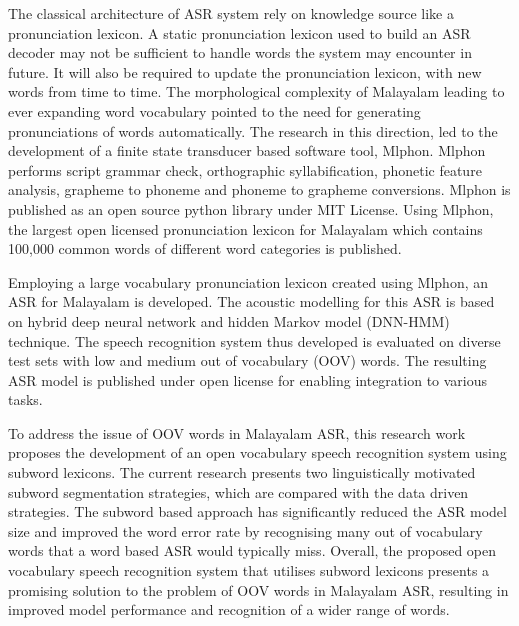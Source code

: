 The classical architecture of ASR system rely on knowledge source like a pronunciation lexicon. A static pronunciation lexicon used to build an
ASR decoder may not be sufficient to handle words the system may encounter in
future. It will also be required to  update the pronunciation lexicon, with new words from time to time.  The morphological complexity of Malayalam leading to ever expanding word vocabulary pointed to the need for generating pronunciations of words automatically. The research in this direction, led to the development of a finite state transducer based software tool, Mlphon. Mlphon performs script grammar check, orthographic syllabification, phonetic feature analysis, grapheme to phoneme and phoneme to grapheme conversions. Mlphon is published as an open source python library under MIT License. Using Mlphon, the largest open licensed pronunciation lexicon for Malayalam which contains 100,000 common words of different word categories is published.

Employing a large vocabulary pronunciation lexicon created using Mlphon, an ASR for Malayalam is developed. The acoustic modelling for this ASR is based on hybrid deep neural network and hidden Markov model (DNN-HMM) technique. The speech recognition system thus developed is evaluated on diverse test sets with low and medium out of vocabulary (OOV) words. The resulting ASR model is published under open license for enabling integration to various tasks.

To address the issue of OOV words in Malayalam ASR, this research work proposes the development of an open vocabulary speech recognition system using subword lexicons. The current research presents two linguistically motivated subword segmentation strategies, which are compared with the data driven strategies. The subword based approach has significantly reduced the ASR model size and improved the word error rate by recognising many out of vocabulary words that a word based ASR would typically miss. Overall, the proposed open vocabulary speech recognition system that utilises subword lexicons presents a promising solution to the problem of OOV words in Malayalam ASR, resulting in improved model performance and recognition of a wider range of words.




